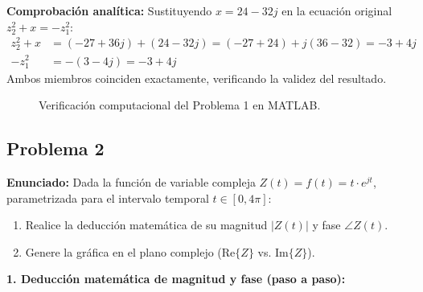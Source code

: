 \documentclass[11pt,a4paper]{article}
\begin{document}
\noindent\textbf{Comprobación analítica:}
Sustituyendo $x = 24 - 32j$ en la ecuación original $z_2^2 + x = -z_1^2$:
\begin{align*}
    z_2^2 + x &= (-27 + 36j) + (24 - 32j) = (-27 + 24) + j(36 - 32) = -3 + 4j \\
    -z_1^2 &= -(3 - 4j) = -3 + 4j
\end{align*}
Ambos miembros coinciden exactamente, verificando la validez del resultado.

\begin{figure}[htbp]
    \centering
    \caption{Verificación computacional del Problema 1 en MATLAB.}
    \label{fig:verificacion_p1_matlab}
\end{figure}

\subsection{Problema 2}

\noindent\textbf{Enunciado:} Dada la función de variable compleja $Z(t) = f(t) = t \cdot e^{jt}$, parametrizada para el intervalo temporal $t \in [0, 4\pi]$:
\begin{enumerate}
    \item Realice la deducción matemática de su magnitud $|Z(t)|$ y fase $\angle Z(t)$.
    \item Genere la gráfica en el plano complejo ($\text{Re}\{Z\}$ vs. $\text{Im}\{Z\}$).
\end{enumerate}

\noindent\textbf{1. Deducción matemática de magnitud y fase (paso a paso):}
\end{document}
